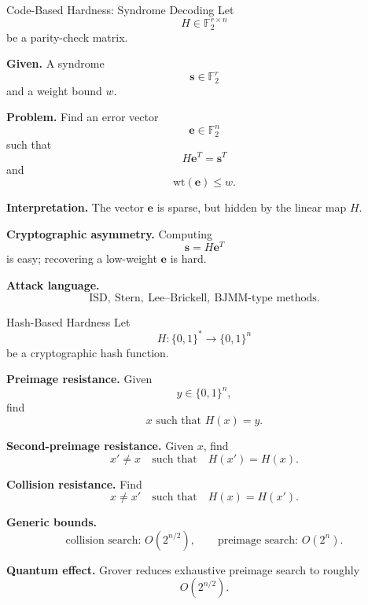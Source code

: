 \documentclass[aspectratio=169]{beamer}
\begin{document}
	\begin{frame}{Code-Based Hardness: Syndrome Decoding}
		Let
		\[
		H \in \mathbb{F}_2^{r \times n}
		\]
		be a parity-check matrix.
		
		\textbf{Given.}
		A syndrome
		\[
		\bm{s} \in \mathbb{F}_2^r
		\]
		and a weight bound $w$.
		
		\textbf{Problem.}
		Find an error vector
		\[
		\bm{e} \in \mathbb{F}_2^n
		\]
		such that
		\[
		H\bm{e}^T = \bm{s}^T
		\]
		and
		\[
		\mathrm{wt}(\bm{e}) \le w.
		\]
		
		\vspace{0.4em}
		\textbf{Interpretation.}
		The vector $\bm{e}$ is sparse, but hidden by the linear map $H$.
		
		\vspace{0.4em}
		\textbf{Cryptographic asymmetry.}
		Computing
		\[
		\bm{s} = H\bm{e}^T
		\]
		is easy; recovering a low-weight $\bm{e}$ is hard.
		
		\vspace{0.4em}
		\textbf{Attack language.}
		\[
		\text{ISD},\ \text{Stern},\ \text{Lee--Brickell},\ \text{BJMM-type methods}.
		\]
	\end{frame}
	
	
	\begin{frame}{Hash-Based Hardness}
		Let
		\[
		H : \{0,1\}^\ast \to \{0,1\}^n
		\]
		be a cryptographic hash function.
		
		\textbf{Preimage resistance.}
		Given
		\[
		y \in \{0,1\}^n,
		\]
		find
		\[
		x \text{ such that } H(x)=y.
		\]
		
		\textbf{Second-preimage resistance.}
		Given $x$, find
		\[
		x' \neq x
		\quad \text{such that} \quad
		H(x') = H(x).
		\]
		
		\textbf{Collision resistance.}
		Find
		\[
		x \neq x'
		\quad \text{such that} \quad
		H(x)=H(x').
		\]
		
		\vspace{0.4em}
		\textbf{Generic bounds.}
		\[
		\text{collision search: } O(2^{n/2}),
		\qquad
		\text{preimage search: } O(2^n).
		\]
		
		\textbf{Quantum effect.}
		Grover reduces exhaustive preimage search to roughly
		\[
		O(2^{n/2}).
		\]
	\end{frame}
	
	
\end{document}
